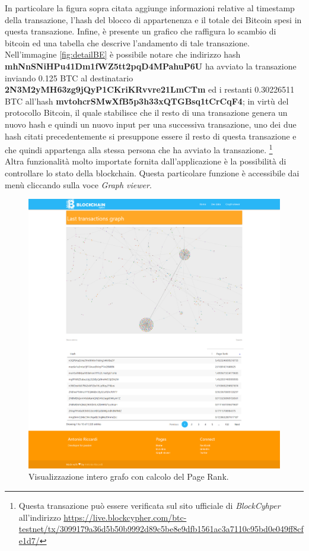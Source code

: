 In particolare la figura sopra citata aggiunge informazioni relative al timestamp della transazione, l'hash del blocco di appartenenza e il totale dei Bitcoin spesi in questa transazione. Infine, è presente un grafico che raffigura lo scambio di bitcoin ed una tabella che descrive l'andamento di tale transazione. Nell'immagine \ref{fig:detailBE} è possibile notare che indirizzo hash \textbf{mhNnSNiHPu41Dm1fWZ5tt2pqD4MPahuP6U} ha avviato la transazione inviando 0.125 BTC al destinatario \textbf{2N3M2yMH63zg9jQyP1CKriKRvvre21LmCTm} ed i restanti 0.30226511 BTC all'hash \textbf{mvtohcrSMwXfB5p3h33xQTGBsq1tCrCqF4}; in virtù del protocollo Bitcoin, il quale stabilisce che il resto di una transazione genera un nuovo hash e quindi un nuovo input per una successiva transazione, uno dei due hash citati precedentemente si presuppone essere il resto di questa transazione e che quindi appartenga alla stessa persona che ha avviato la transazione. \footnote{Questa transazione può essere verificata sul sito ufficiale di \textit{BlockCyhper} all'indirizzo \url{https://live.blockcypher.com/btc-testnet/tx/3099179a36d5b50b9992d89c5be8e9dfb1561ac3a7110c95bd0e049ff8cfe1d7/}}
\\Altra funzionalità molto importate fornita dall'applicazione è la possibilità di controllare lo stato della blockchain. Questa particolare funzione è accessibile dai menù cliccando sulla voce \textit{Graph viewer}.
\begin{figure}[H]
	\centering
	\includegraphics[width=\textwidth, height=0.65\textheight]{images/pageRankView.png}
	\caption{Visualizzazione intero grafo con calcolo del Page Rank.}
	\label{fig:graphPageBE}
\end{figure}
